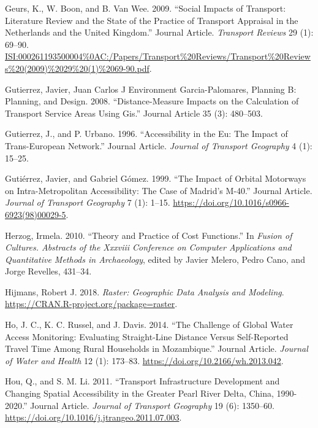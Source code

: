 \documentclass[]{elsarticle} %
\begin{document}
\leavevmode\hypertarget{ref-Geurs2009}{}%
Geurs, K., W. Boon, and B. Van Wee. 2009. ``Social Impacts of Transport:
Literature Review and the State of the Practice of Transport Appraisal
in the Netherlands and the United Kingdom.'' Journal Article.
\emph{Transport Reviews} 29 (1): 69--90.
\url{ISI:000261193500004\%0AC:/Papers/Transport\%20Reviews/Transport\%20Reviews\%20(2009)\%2029\%20(1)\%2069-90.pdf}.

\leavevmode\hypertarget{ref-Gutierrez2008}{}%
Gutierrez, Javier, Juan Carlos J Environment Garcia-Palomares, Planning
B: Planning, and Design. 2008. ``Distance-Measure Impacts on the
Calculation of Transport Service Areas Using Gis.'' Journal Article 35
(3): 480--503.

\leavevmode\hypertarget{ref-Gutierrez1996}{}%
Gutierrez, J., and P. Urbano. 1996. ``Accessibility in the Eu: The
Impact of Trans-European Network.'' Journal Article. \emph{Journal of
Transport Geography} 4 (1): 15--25.

\leavevmode\hypertarget{ref-Gutierrez1999impact}{}%
Gutiérrez, Javier, and Gabriel Gómez. 1999. ``The Impact of Orbital
Motorways on Intra-Metropolitan Accessibility: The Case of Madrid's
M-40.'' Journal Article. \emph{Journal of Transport Geography} 7 (1):
1--15. \url{https://doi.org/10.1016/s0966-6923(98)00029-5}.

\leavevmode\hypertarget{ref-Herzog2010theory}{}%
Herzog, Irmela. 2010. ``Theory and Practice of Cost Functions.'' In
\emph{Fusion of Cultures. Abstracts of the Xxxviii Conference on
Computer Applications and Quantitative Methods in Archaeology}, edited
by Javier Melero, Pedro Cano, and Jorge Revelles, 431--34.

\leavevmode\hypertarget{ref-Hijmans2018raster}{}%
Hijmans, Robert J. 2018. \emph{Raster: Geographic Data Analysis and
Modeling}. \url{https://CRAN.R-project.org/package=raster}.

\leavevmode\hypertarget{ref-Ho2014}{}%
Ho, J. C., K. C. Russel, and J. Davis. 2014. ``The Challenge of Global
Water Access Monitoring: Evaluating Straight-Line Distance Versus
Self-Reported Travel Time Among Rural Households in Mozambique.''
Journal Article. \emph{Journal of Water and Health} 12 (1): 173--83.
\url{https://doi.org/10.2166/wh.2013.042}.

\leavevmode\hypertarget{ref-Hou2011transport}{}%
Hou, Q., and S. M. Li. 2011. ``Transport Infrastructure Development and
Changing Spatial Accessibility in the Greater Pearl River Delta, China,
1990-2020.'' Journal Article. \emph{Journal of Transport Geography} 19
(6): 1350--60. \url{https://doi.org/10.1016/j.jtrangeo.2011.07.003}.
\end{document}
